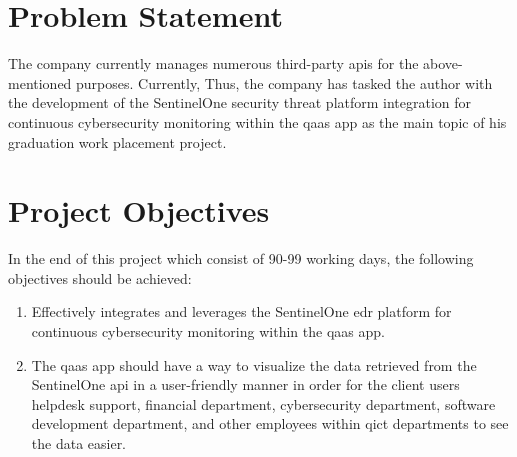 \begin{multicols}{2}
      \section{Problem Statement}
      The company currently manages numerous third-party \acrshort{api}s for the above-mentioned purposes.
      Currently,
      Thus, the company has tasked the author with the development of the SentinelOne security threat platform integration
      for continuous cybersecurity monitoring within the \acrshort{qaas} app as the main topic of his graduation work placement
      project.

      \section{Project Objectives}
      In the end of this project which consist of 90-99 working days, the following objectives should be achieved:
      \begin{enumerate}
            \item Effectively integrates and leverages the SentinelOne \acrshort{edr} platform for continuous
                  cybersecurity monitoring within the \acrshort{qaas} app.
            \item The \acrshort{qaas} app should have a way to visualize the data retrieved from the SentinelOne
                  \acrshort{api} in a user-friendly manner in order for the client users helpdesk support, financial
                  department, cybersecurity department, software development department, and other employees within
                  \acrshort{qict}  departments to see the data easier.
      \end{enumerate}

\end{multicols}
